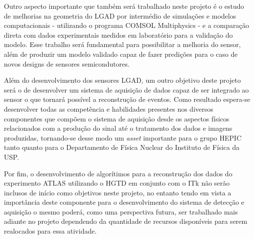 Outro aspecto importante que também será trabalhado neste projeto é o estudo de melhorias na geometria do LGAD por intermédio de simulações e modelos computacionais - utilizando o programa COMSOL Multiphysics \cite{COMSOL} - e a comparação direta com dados experimentais medidos em laboratório para a validação do modelo. Esse trabalho será fundamental para possibilitar a melhoria do sensor, além de produzir um modelo validado capaz de fazer predições para o caso de novos designs de sensores semicondutores. 

Além do desenvolvimento dos sensores LGAD, um outro objetivo deste projeto será o de desenvolver um sistema de aquisição de dados capaz de ser integrado ao sensor o que tornará possível a reconstrução de eventos. Como resultado espera-se desenvolver todas as competência e habilidades presentes nos diversos componentes que compõem o sistema de aquisição desde os aspectos físicos relacionados com a produção do sinal até o tratamento dos dados e imagens produzidas, tornando-se desse modo um {\it asset} importante para o grupo HEPIC tanto quanto para o Departamento de Física Nuclear do Instituto de Física da USP.

Por fim, o desenvolvimento de algorítimos para a reconstrução dos dados do experimento ATLAS utilizando o HGTD em conjunto com o ITk não serão inclusos de início como objetivos neste projeto, no entanto tendo em vista a importância deste componente para o desenvolvimento do sistema de detecção e aquisição o mesmo poderá, como uma perspectiva futura, ser trabalhado mais adiante no projeto dependendo da quantidade de recursos disponíveis para serem realocados para essa atividade.  

